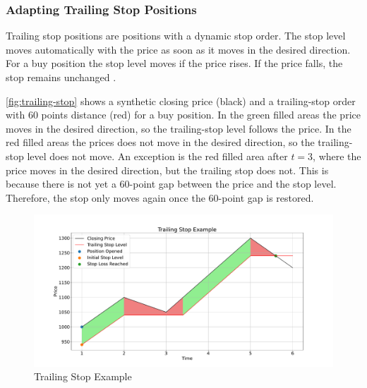 \subsubsection{Adapting Trailing Stop Positions}

Trailing stop positions are positions with a dynamic stop order.
The stop level moves automatically with the price as soon as it moves in the desired direction.
For a buy position the stop level moves if the price rises.
If the price falls, the stop remains unchanged \cite{ig-trailing}.

\autoref{fig:trailing-stop} shows a synthetic closing price (black) and a trailing-stop order with 60 points distance (red) for a buy position.
In the green filled areas the price moves in the desired direction, so the trailing-stop level follows the price.
In the red filled areas the prices does not move in the desired direction, so the trailing-stop level does not move.
An exception is the red filled area after $t=3$, where the price moves in the desired direction, but the trailing stop does not.
This is because there is not yet a 60-point gap between the price and the stop level.
Therefore, the stop only moves again once the 60-point gap is restored.

\begin{figure}[H]
    \centering
    \includegraphics[width=\textwidth]{images/trading-engine/trailing-stop}
    \caption{Trailing Stop Example}
    \label{fig:trailing-stop}
\end{figure}



